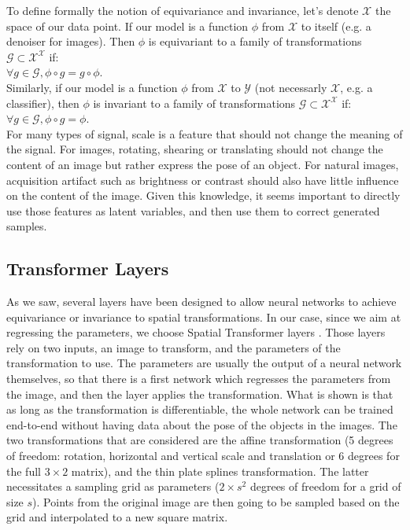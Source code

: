 \documentclass[letterpaper, twoside]{article}
\begin{document}
        To define formally the notion of equivariance and invariance, let's denote $\mathcal{X}$ the space of our data point. If our model is a function $\phi$ from $\mathcal{X}$ to itself (e.g. a denoiser for images). Then $\phi$ is equivariant to a family of transformations $\mathcal{G} \subset \mathcal{X}^\mathcal{X}$ if: \\
        $\forall g \in \mathcal{G}, \phi \circ g = g \circ \phi$.\\
        Similarly, if our model is a function $\phi$ from $\mathcal{X}$ to $\mathcal{Y}$ (not necessarly $\mathcal{X}$, e.g. a classifier), then $\phi$ is invariant to a family of transformations $\mathcal{G} \subset \mathcal{X}^\mathcal{X}$ if: \\
        $\forall g \in \mathcal{G}, \phi \circ g = \phi$.\\
        For many types of signal, scale is a feature that should not change the meaning of the signal. For images, rotating, shearing or translating should not change the content of an image but rather express the pose of an object. For natural images, acquisition artifact such as brightness or contrast should also have little influence on the content of the image. Given this knowledge, it seems important to directly use those features as latent variables, and then use them to correct generated samples.\\

  \subsection{Transformer Layers}


    As we saw, several layers have been designed to allow neural networks to achieve equivariance or invariance to spatial transformations. In our case, since we aim at regressing the parameters, we choose Spatial Transformer layers \cite{Jaderberg.stn}. Those layers rely on two inputs, an image to transform, and the parameters of the transformation to use. The parameters are usually the output of a neural network themselves, so that there is a first network which regresses the parameters from the image, and then the layer applies the transformation. What is shown is that as long as the transformation is differentiable, the whole network can be trained end-to-end without having data about the pose of the objects in the images. The two transformations that are considered are the affine transformation (5 degrees of freedom: rotation, horizontal and vertical scale and translation or 6 degrees for the full $3\times 2$ matrix), and the thin plate splines transformation. The latter necessitates a sampling grid as parameters ($2 \times s^2$ degrees of freedom for a grid of size $s$). Points from the original image are then going to be sampled based on the grid and interpolated to a new square matrix.\\
\end{document}
